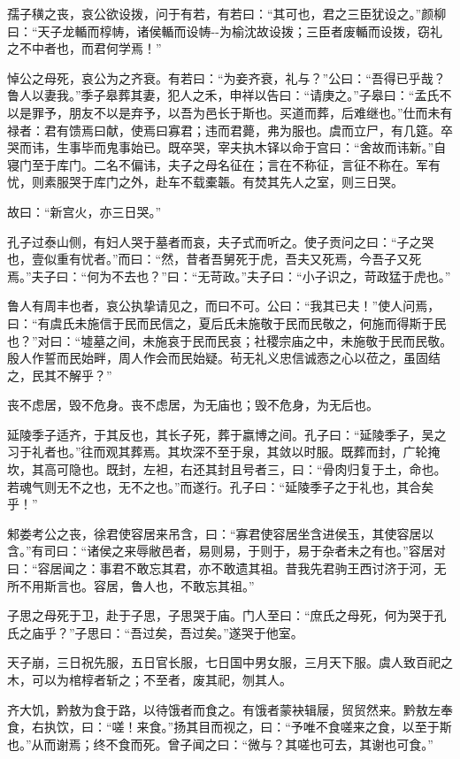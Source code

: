 \documentclass[]{article}
\begin{document}
孺子穔之丧，哀公欲设拨，问于有若，有若曰：``其可也，君之三臣犹设之。''颜柳曰：``天子龙輴而椁帱，诸侯輴而设帱-\/-为榆沈故设拨；三臣者废輴而设拨，窃礼之不中者也，而君何学焉！''

悼公之母死，哀公为之齐衰。有若曰：``为妾齐衰，礼与？''公曰：``吾得已乎哉？鲁人以妻我。''季子皋葬其妻，犯人之禾，申祥以告曰：``请庚之。''子皋曰：``孟氏不以是罪予，朋友不以是弃予，以吾为邑长于斯也。买道而葬，后难继也。''仕而未有禄者：君有馈焉曰献，使焉曰寡君；违而君薨，弗为服也。虞而立尸，有几筵。卒哭而讳，生事毕而鬼事始已。既卒哭，宰夫执木铎以命于宫曰：``舍故而讳新。''自寝门至于库门。二名不偏讳，夫子之母名征在；言在不称征，言征不称在。军有忧，则素服哭于库门之外，赴车不载橐韔。有焚其先人之室，则三日哭。

故曰：``新宫火，亦三日哭。''

孔子过泰山侧，有妇人哭于墓者而哀，夫子式而听之。使子贡问之曰：``子之哭也，壹似重有忧者。''而曰：``然，昔者吾舅死于虎，吾夫又死焉，今吾子又死焉。''夫子曰：``何为不去也？''曰：``无苛政。''夫子曰：``小子识之，苛政猛于虎也。''

鲁人有周丰也者，哀公执挚请见之，而曰不可。公曰：``我其已夫！''使人问焉，曰：``有虞氏未施信于民而民信之，夏后氏未施敬于民而民敬之，何施而得斯于民也？''对曰：``墟墓之间，未施哀于民而民哀；社稷宗庙之中，未施敬于民而民敬。殷人作誓而民始畔，周人作会而民始疑。茍无礼义忠信诚悫之心以莅之，虽固结之，民其不解乎？''

丧不虑居，毁不危身。丧不虑居，为无庙也；毁不危身，为无后也。

延陵季子适齐，于其反也，其长子死，葬于嬴博之间。孔子曰：``延陵季子，吴之习于礼者也。''往而观其葬焉。其坎深不至于泉，其敛以时服。既葬而封，广轮掩坎，其高可隐也。既封，左袒，右还其封且号者三，曰：``骨肉归复于土，命也。若魂气则无不之也，无不之也。''而遂行。孔子曰：``延陵季子之于礼也，其合矣乎！''

邾娄考公之丧，徐君使容居来吊含，曰：``寡君使容居坐含进侯玉，其使容居以含。''有司曰：``诸侯之来辱敝邑者，易则易，于则于，易于杂者未之有也。''容居对曰：``容居闻之：事君不敢忘其君，亦不敢遗其祖。昔我先君驹王西讨济于河，无所不用斯言也。容居，鲁人也，不敢忘其祖。''

子思之母死于卫，赴于子思，子思哭于庙。门人至曰：``庶氏之母死，何为哭于孔氏之庙乎？''子思曰：``吾过矣，吾过矣。''遂哭于他室。

天子崩，三日祝先服，五日官长服，七日国中男女服，三月天下服。虞人致百祀之木，可以为棺椁者斩之；不至者，废其祀，刎其人。

齐大饥，黔敖为食于路，以待饿者而食之。有饿者蒙袂辑屦，贸贸然来。黔敖左奉食，右执饮，曰：``嗟！来食。''扬其目而视之，曰：``予唯不食嗟来之食，以至于斯也。''从而谢焉；终不食而死。曾子闻之曰：``微与？其嗟也可去，其谢也可食。''
\end{document}
